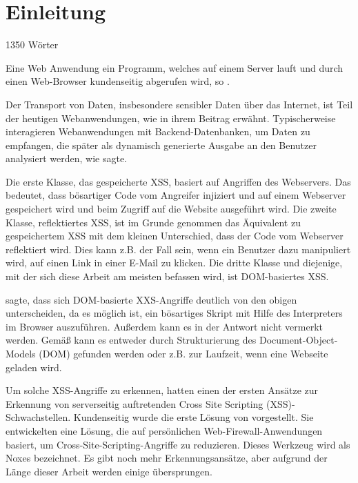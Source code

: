 \section{Einleitung}
\label{section:Einleitung} 1350 Wörter

Eine Web Anwendung ein Programm, welches auf einem Server lauft und durch einen Web-Browser kundenseitig abgerufen wird, so \textcite[1]{mahmoud2017}.

Der Transport von Daten, insbesondere sensibler Daten über das Internet, ist Teil der heutigen Webanwendungen, wie \textcite[1]{kirda2009} in ihrem Beitrag erwähnt. Typischerweise interagieren Webanwendungen mit Backend-Datenbanken, um Daten zu empfangen, die später als dynamisch generierte Ausgabe an den Benutzer analysiert werden, wie \textcite[1]{su2006} sagte.

Die erste Klasse, das gespeicherte XSS, basiert auf Angriffen des Webservers. Das bedeutet, dass bösartiger Code vom Angreifer injiziert und auf einem Webserver gespeichert wird und beim Zugriff auf die Website ausgeführt wird.
Die zweite Klasse, reflektiertes XSS, ist im Grunde genommen das Äquivalent zu gespeichertem XSS mit dem kleinen Unterschied, dass der Code vom Webserver reflektiert wird. Dies kann z.B. der Fall sein, wenn ein Benutzer dazu manipuliert wird, auf einen Link in einer E-Mail zu klicken. Die dritte Klasse und diejenige, mit der sich diese Arbeit am meisten befassen wird, ist DOM-basiertes XSS.\autocite{kirda2009} 

\textcite[]{Sarmah2018} sagte, dass sich DOM-basierte XXS-Angriffe deutlich von den obigen unterscheiden, da es möglich ist, ein bösartiges Skript mit Hilfe des Interpreters im Browser auszuführen.
Außerdem kann es in der Antwort nicht vermerkt werden. Gemäß \textcite[]{Sarmah2018} kann es entweder durch Strukturierung des Document-Object-Models (DOM) gefunden werden oder z.B. zur Laufzeit, wenn eine Webseite geladen wird. 

Um solche XSS-Angriffe zu erkennen, hatten \textcite[]{Wassermann2008} einen der ersten Ansätze zur Erkennung von serverseitig auftretenden Cross Site Scripting (XSS)-Schwachstellen. Kundenseitig wurde die erste Lösung von \textcite[]{Kirda2009} vorgestellt. Sie entwickelten eine Lösung, die auf persönlichen Web-Firewall-Anwendungen basiert, um Cross-Site-Scripting-Angriffe zu reduzieren. Dieses Werkzeug wird als Noxes bezeichnet. Es gibt noch mehr Erkennungsansätze, aber aufgrund der Länge dieser Arbeit werden einige übersprungen.

